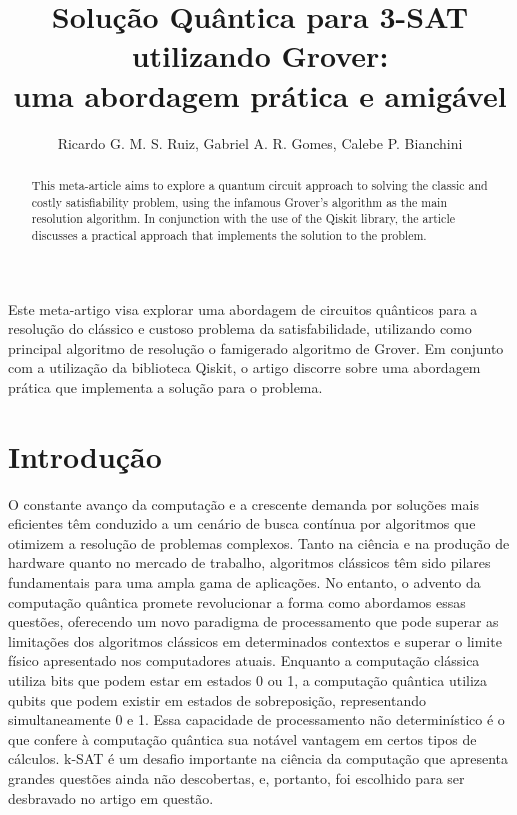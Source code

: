 \documentclass[12pt]{article}
\title{Solução Quântica para 3-SAT utilizando Grover:\\uma abordagem prática e amigável}
\author{Ricardo G. M. S. Ruiz\inst{1}, Gabriel A. R. Gomes\inst{1}, Calebe P. Bianchini\inst{1}}
\begin{document}
\maketitle

\begin{abstract}
    This meta-article aims to explore a quantum circuit approach to solving the classic and costly satisfiability problem, using the infamous Grover’s algorithm as the main resolution algorithm. In conjunction with the use of the Qiskit library, the article discusses a practical approach that implements the solution to the problem.
\end{abstract} 
\begin{resumo} 
  Este meta-artigo visa explorar uma abordagem de circuitos quânticos para a resolução do clássico e custoso problema da satisfabilidade, utilizando como principal algoritmo de resolução o famigerado algoritmo de Grover. Em conjunto com a utilização da biblioteca Qiskit, o artigo discorre sobre uma abordagem prática que implementa a solução para o problema.
\end{resumo}


\section{Introdução}

O constante avanço da computação e a crescente demanda por soluções mais eficientes têm conduzido a um cenário de busca contínua por algoritmos que otimizem a resolução de problemas complexos. Tanto na ciência e na produção de hardware quanto no mercado de trabalho, algoritmos clássicos têm sido pilares fundamentais para uma ampla gama de aplicações. No entanto, o advento da computação quântica promete revolucionar a forma como abordamos essas questões, oferecendo um novo paradigma de processamento que pode superar as limitações dos algoritmos clássicos em determinados contextos e superar o limite físico apresentado nos computadores atuais. Enquanto a computação clássica utiliza bits que podem estar em estados 0 ou 1, a computação quântica utiliza qubits que podem existir em estados de sobreposição, representando simultaneamente 0 e 1. Essa capacidade de processamento não determinístico é o que confere à computação quântica sua notável vantagem em certos tipos de cálculos. k-SAT é um desafio importante na ciência da computação que apresenta grandes questões ainda não descobertas, e, portanto, foi escolhido para ser desbravado no artigo em questão.
\end{document}
